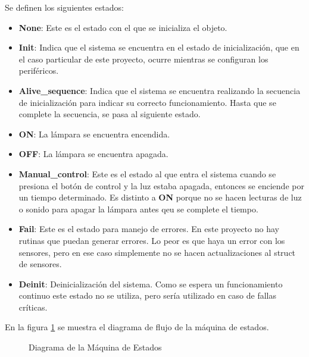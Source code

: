 Se definen los siguientes estados:

\begin{itemize}
\item \textbf{None}: Este es el estado con el que se inicializa el objeto. 
\item \textbf{Init}: Indica que el sistema se encuentra en el estado de inicialización, que en el
  caso particular de este proyecto, ocurre mientras se configuran los periféricos.
\item \textbf{Alive\_sequence}: Indica que el sistema se encuentra realizando la secuencia de
  inicialización para indicar su correcto funcionamiento. Hasta que se complete la secuencia, se
  pasa al siguiente estado. 
\item \textbf{ON}: La lámpara se encuentra encendida.
\item \textbf{OFF}: La lámpara se encuentra apagada.
\item \textbf{Manual\_control}: Este es el estado al que entra el sistema cuando se presiona el
  botón de control y la luz estaba apagada, entonces se enciende por un tiempo determinado. Es
  distinto a \textbf{ON} porque no se hacen lecturas de luz o sonido para apagar la lámpara antes
  qeu se complete el tiempo.
\item \textbf{Fail}: Este es el estado para manejo de errores. En este proyecto no hay rutinas que
  puedan generar errores. Lo peor es que haya un error con los sensores, pero en ese caso simplemente
  no se hacen actualizaciones al struct de sensores. 
\item \textbf{Deinit}: Deinicialización del sistema. Como se espera un funcionamiento continuo este
  estado no se utiliza, pero sería utilizado en caso de fallas críticas. 
\end{itemize}

En la figura \ref{fig:state_machine} se muestra el diagrama de flujo de la máquina de estados. 

\begin{figure}
\centering
\scalebox{.4}{}
\caption{Diagrama de la Máquina de Estados}
\label{fig:state_machine}
\end{figure}



\newpage
